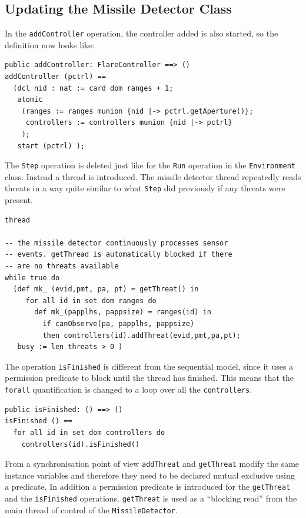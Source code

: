 \documentclass{overturerepchap}
\begin{document}
\subsection{Updating the Missile Detector Class}

In the \texttt{addController} operation, the controller added is also started,
so the definition now looks like:

\begin{lstlisting}
public addController: FlareController ==> ()
addController (pctrl) ==
  (dcl nid : nat := card dom ranges + 1;
   atomic
    (ranges := ranges munion {nid |-> pctrl.getAperture()};
     controllers := controllers munion {nid |-> pctrl}
    );
   start (pctrl) );
\end{lstlisting}

The \texttt{Step} operation is deleted just like for the \texttt{Run}
operation in the \texttt{Environment} class. Instead a thread is
introduced. The missile detector thread repeatedly reads threats 
in a way quite similar to what \texttt{Step} did previously if any threats
were present.

\begin{lstlisting} 
thread

-- the missile detector continuously processes sensor
-- events. getThread is automatically blocked if there
-- are no threats available
while true do
  (def mk_ (evid,pmt, pa, pt) = getThreat() in
     for all id in set dom ranges do
       def mk_(papplhs, pappsize) = ranges(id) in
         if canObserve(pa, papplhs, pappsize)
         then controllers(id).addThreat(evid,pmt,pa,pt);
   busy := len threats > 0 )
\end{lstlisting}

The operation \texttt{isFinished} is different from the sequential
model, since it uses a permission predicate to block until the thread
has finished. This means that the \texttt{forall} quantification is
changed to a loop over all the \texttt{controllers}.

\begin{lstlisting}
public isFinished: () ==> ()
isFinished () ==
  for all id in set dom controllers do
    controllers(id).isFinished()
\end{lstlisting}

From a synchronisation point of view \texttt{addThreat} and 
\texttt{getThreat} modify the same instance variables and
therefore they need to be declared mutual exclusive using a
{\bf{}} 
predicate. In addition a permission predicate is introduced for the
\texttt{getThreat} and the \texttt{isFinished} operations. 
\texttt{getThreat} is used as a ``blocking read'' from the main
thread of control of the \texttt{MissileDetector}.
\end{document}
